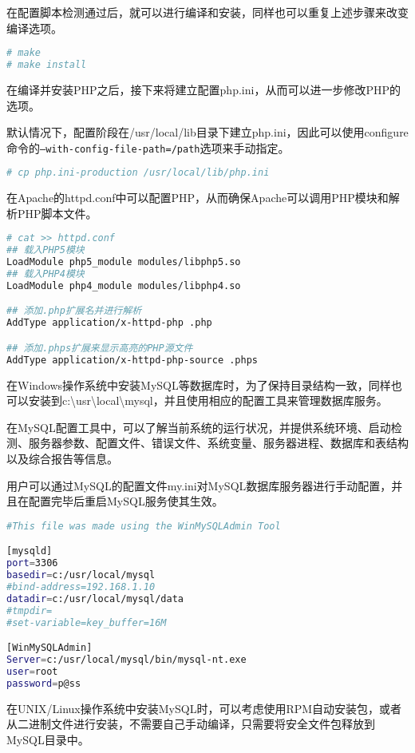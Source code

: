 在配置脚本检测通过后，就可以进行编译和安装，同样也可以重复上述步骤来改变编译选项。

\begin{lstlisting}[language=bash]
# make
# make install
\end{lstlisting}

在编译并安装PHP之后，接下来将建立配置php.ini，从而可以进一步修改PHP的选项。

默认情况下，配置阶段在/usr/local/lib目录下建立php.ini，因此可以使用configure命令的\texttt{--with-config-file-path=/path}选项来手动指定。

\begin{lstlisting}[language=bash]
# cp php.ini-production /usr/local/lib/php.ini
\end{lstlisting}


在Apache的httpd.conf中可以配置PHP，从而确保Apache可以调用PHP模块和解析PHP脚本文件。

\begin{lstlisting}[language=bash]
# cat >> httpd.conf
## 载入PHP5模块
LoadModule php5_module modules/libphp5.so
## 载入PHP4模块
LoadModule php4_module modules/libphp4.so

## 添加.php扩展名并进行解析
AddType application/x-httpd-php .php

## 添加.phps扩展来显示高亮的PHP源文件
AddType application/x-httpd-php-source .phps
\end{lstlisting}

在Windows操作系统中安装MySQL等数据库时，为了保持目录结构一致，同样也可以安装到c:\textbackslash usr\textbackslash local\textbackslash mysql，并且使用相应的配置工具来管理数据库服务。

在MySQL配置工具中，可以了解当前系统的运行状况，并提供系统环境、启动检测、服务器参数、配置文件、错误文件、系统变量、服务器进程、数据库和表结构以及综合报告等信息。

用户可以通过MySQL的配置文件my.ini对MySQL数据库服务器进行手动配置，并且在配置完毕后重启MySQL服务使其生效。

\begin{lstlisting}[language=bash]
#This file was made using the WinMySQLAdmin Tool

[mysqld]
port=3306
basedir=c:/usr/local/mysql
#bind-address=192.168.1.10
datadir=c:/usr/local/mysql/data
#tmpdir=
#set-variable=key_buffer=16M

[WinMySQLAdmin]
Server=c:/usr/local/mysql/bin/mysql-nt.exe
user=root
password=p@ss
\end{lstlisting}

在UNIX/Linux操作系统中安装MySQL时，可以考虑使用RPM自动安装包，或者从二进制文件进行安装，不需要自己手动编译，只需要将安全文件包释放到MySQL目录中。


